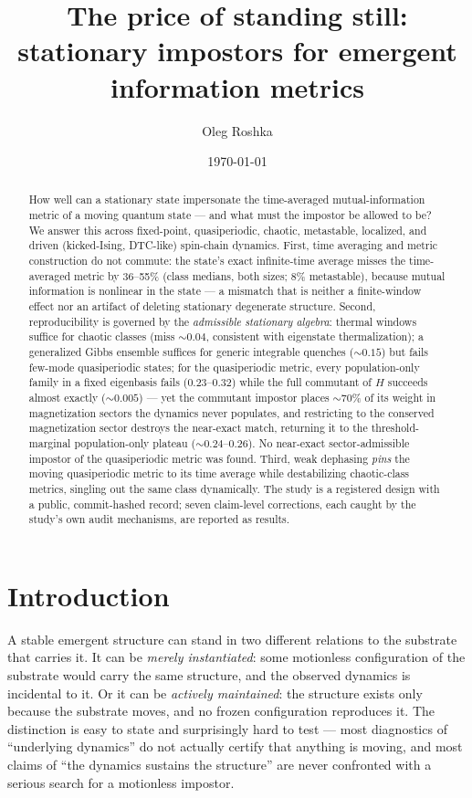 \documentclass[a4paper,11pt,noarxiv]{quantumarticle}
\title{The price of standing still: stationary impostors for emergent
information metrics}
\author{Oleg Roshka}
\affiliation{Independent Researcher \textnormal{--}
\href{https://orcid.org/0009-0009-3075-9417}{ORCID
0009-0009-3075-9417}}
\date{\today}
\begin{document}
\maketitle

\begin{abstract}
How well can a stationary state impersonate the time-averaged
mutual-information metric of a moving quantum state --- and what must
the impostor be allowed to be? We answer this across fixed-point,
quasiperiodic, chaotic, metastable, localized, and driven
(kicked-Ising, DTC-like) spin-chain dynamics. First, time averaging
and metric construction do not commute: the state's exact
infinite-time average misses the time-averaged metric by 36--55\%
(class medians, both sizes; 8\% metastable), because mutual information is
nonlinear in the state --- a mismatch that is neither a finite-window
effect nor an artifact of deleting stationary degenerate structure.
Second, reproducibility is governed by the \emph{admissible stationary
algebra}: thermal windows suffice for chaotic classes (miss
$\sim 0.04$, consistent with eigenstate thermalization); a generalized
Gibbs ensemble suffices for generic integrable quenches ($\sim 0.15$)
but fails few-mode quasiperiodic states; for the quasiperiodic metric,
every population-only family in a fixed eigenbasis fails
($0.23$--$0.32$) while the full commutant of $H$ succeeds almost
exactly ($\sim 0.005$) --- yet the commutant impostor places
$\sim\!70\%$ of its weight in magnetization sectors the dynamics never
populates, and restricting to the conserved magnetization sector
destroys the near-exact match, returning it to the threshold-marginal
population-only plateau ($\sim 0.24$--$0.26$). No near-exact
sector-admissible impostor of the quasiperiodic metric was found.
Third, weak dephasing \emph{pins} the moving
quasiperiodic metric to its time average while destabilizing
chaotic-class metrics, singling out the same class dynamically. The
study is a registered design with a public, commit-hashed record;
seven claim-level corrections, each caught by the study's own audit
mechanisms, are reported as results.
\end{abstract}

\section{Introduction}\label{sec:intro}

A stable emergent structure can stand in two different relations to the
substrate that carries it. It can be \emph{merely instantiated}: some
motionless configuration of the substrate would carry the same
structure, and the observed dynamics is incidental to it. Or it can be
\emph{actively maintained}: the structure exists only because the
substrate moves, and no frozen configuration reproduces it. The
distinction is easy to state and surprisingly hard to test --- most
diagnostics of ``underlying dynamics'' do not actually certify that
anything is moving, and most claims of ``the dynamics sustains the
structure'' are never confronted with a serious search for a motionless
impostor.
\end{document}
